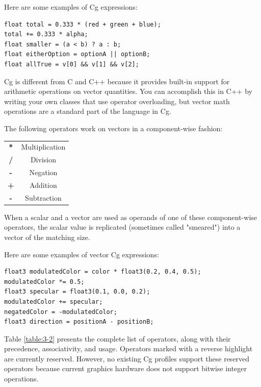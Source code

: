 \documentclass{book}
\begin{document}
Here are some examples of Cg expressions:

\FloatBarrier
\begin{lstlisting}
float total = 0.333 * (red + green + blue);
total += 0.333 * alpha;
float smaller = (a < b) ? a : b;
float eitherOption = optionA || optionB;
float allTrue = v[0] && v[1] && v[2];
\end{lstlisting}
\FloatBarrier

Cg is different from C and C++ because it provides built-in support for arithmetic operations on vector quantities. You can accomplish this in C++ by writing your own classes that use operator overloading, but vector math operations are a standard part of the language in Cg.

The following operators work on vectors in a component-wise fashion:

\FloatBarrier
\begin{tabular}{ |c|c| } 
\textbf{*} & Multiplication \\
\textbf{/} & Division \\
\textbf{-} & Negation \\
\textbf{+} & Addition \\
\textbf{-} & Subtraction \\
\end{tabular}
\FloatBarrier

When a scalar and a vector are used as operands of one of these component-wise operators, the scalar value is replicated (sometimes called "smeared") into a vector of the matching size.

Here are some examples of vector Cg expressions:

\FloatBarrier
\begin{lstlisting}
float3 modulatedColor = color * float3(0.2, 0.4, 0.5);
modulatedColor *= 0.5;
float3 specular = float3(0.1, 0.0, 0.2);
modulatedColor += specular;
negatedColor = -modulatedColor;
float3 direction = positionA - positionB;
\end{lstlisting}
\FloatBarrier

Table \ref{table:3-2} presents the complete list of operators, along with their precedence, associativity, and usage. Operators marked with a reverse highlight are currently reserved. However, no existing Cg profiles support these reserved operators because current graphics hardware does not support bitwise integer operations.
\end{document}
